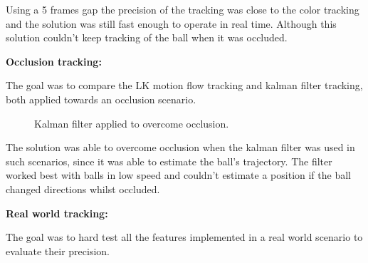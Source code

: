 \documentclass[10pt,twocolumn,letterpaper]{article}
\begin{document}
Using a 5 frames gap the precision of the tracking was close to the color
tracking and the solution was still fast enough to operate in real time.
Although this solution couldn't keep tracking of the ball when it was occluded.

\bigbreak{}
\textbf{Occlusion tracking:}
\bigbreak{}

The goal was to compare the LK motion flow tracking and kalman filter
tracking, both applied towards an occlusion scenario.

\begin{figure}[!h]
\centering
\setlength{\fboxsep}{1pt}
\setlength{\fboxrule}{1pt}
\caption{Kalman filter applied to overcome occlusion.}\label{fig:occlusion}
\end{figure}

The solution was able to overcome occlusion when the kalman filter was used in
such scenarios, since it was able to estimate the ball's trajectory. The
filter worked best with balls in low speed and couldn't estimate a position
if the ball changed directions whilst occluded.

\bigbreak{}
\textbf{Real world tracking:}
\bigbreak{}

The goal was to hard test all the features implemented in a real world
scenario to evaluate their precision.
\end{document}
